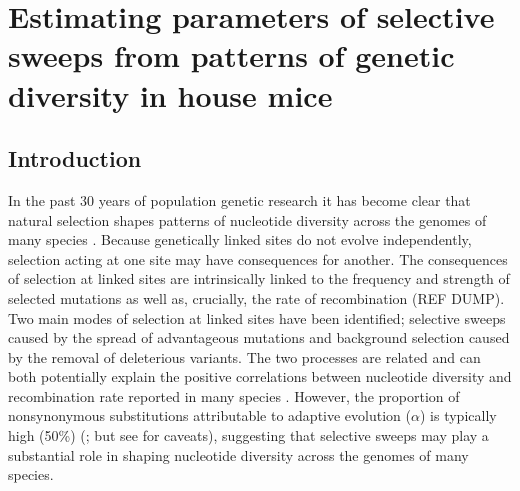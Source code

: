 \chapter{Estimating parameters of selective sweeps from patterns of genetic diversity in house mice}


%
%
\section*{Introduction}

In the past 30 years of population genetic research it has become clear that natural selection shapes patterns of nucleotide diversity across the genomes of many species \citep{RN154, RN117}. Because genetically linked sites do not evolve independently, selection acting at one site may have consequences for another. The consequences of selection at linked sites are intrinsically linked to the frequency and strength of selected mutations as well as, crucially, the rate of recombination (REF DUMP). Two main modes of selection at linked sites have been identified; selective sweeps caused by the spread of advantageous mutations and background selection caused by the removal of deleterious variants. The two processes are related and can both potentially explain the positive correlations between nucleotide diversity and recombination rate reported in many species \citep{RN117}. However, the proportion of nonsynonymous substitutions attributable to adaptive evolution ($\alpha$) is typically high (50\%) (\citealt{RN215}; but see \citealt{RN352} for caveats), suggesting that selective sweeps may play a substantial role in shaping nucleotide diversity across the genomes of many species.

